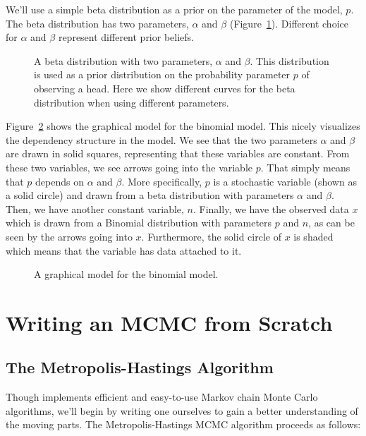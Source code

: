 We'll use a simple beta distribution as a prior on the parameter of the model, $p$.
The beta distribution has two parameters, $\alpha$ and $\beta$ (Figure~\ref{fig:beta_distribution}).
Different choice for $\alpha$ and $\beta$ represent different prior beliefs.
\begin{figure}[h!]
\centering
{}
\label{fig:beta_distribution}
\caption{A beta distribution with two parameters, $\alpha$ and $\beta$. This distribution is used as a prior distribution on the probability parameter $p$ of observing a head. Here we show different curves for the beta distribution when using different parameters.}
\end{figure}


Figure~\ref{fig:binomial_model} shows the graphical model for the binomial model.
This nicely visualizes the dependency structure in the model.
We see that the two parameters $\alpha$ and $\beta$ are drawn in solid squares, representing that these variables are constant.
From these two variables, we see arrows going into the variable $p$.
That simply means that $p$ depends on $\alpha$ and $\beta$.
More specifically, $p$ is a stochastic variable (shown as a solid circle) and drawn from a beta distribution with parameters $\alpha$ and $\beta$.
Then, we have another constant variable, $n$.
Finally, we have the observed data $x$ which is drawn from a Binomial distribution with parameters $p$ and $n$, as can be seen by the arrows going into $x$.
Furthermore, the solid circle of $x$ is shaded which means that the variable has data attached to it.
\begin{figure}[h!]
\centering
{}
\label{fig:binomial_model}
\caption{A graphical model for the binomial model.}
\end{figure}

\section{Writing an MCMC from Scratch}
\subsection{The Metropolis-Hastings Algorithm}
Though \RevBayes implements efficient and easy-to-use Markov chain Monte Carlo algorithms, we'll begin by writing one ourselves to gain a better understanding of the moving parts.
The Metropolis-Hastings MCMC algorithm \citep{Metropolis1953,Hasting1970} proceeds as follows:

